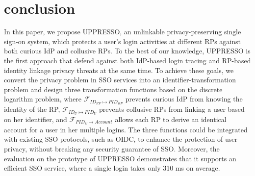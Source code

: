 \section{conclusion}
\label{sec:conclusion}
In this paper, we propose UPPRESSO, an unlinkable privacy-preserving single sign-on system, which protects a user's login activities at different RPs against both curious IdP and collusive RPs. To the best of our knowledge, UPPRESSO is the first approach that defend against both IdP-based login tracing and RP-based identity linkage privacy threats at the same time. To achieve these goals, we convert the privacy problem in SSO services into an identifier-transformation problem and design three transformation functions based on the discrete logarithm problem, where $\mathcal{F}_{ID_{RP} \mapsto PID_{RP}}$ prevents curious IdP from knowing the identity of the RP, $\mathcal{F}_{ID_{U} \mapsto PID_{U}}$ prevents collusive RPs from linking a user based on her identifier, and $\mathcal{F}_{PID_{U} \mapsto Account}$ allows each RP to derive an identical account for a user in her multiple logins. The three functions could be integrated with existing SSO protocols, such as OIDC, to enhance the protection of user privacy, without breaking any security guarantee of SSO. Moreover, the evaluation on the prototype of UPPRESSO demonstrates that it supports an efficient SSO service, where a single login takes only 310 ms on average.
